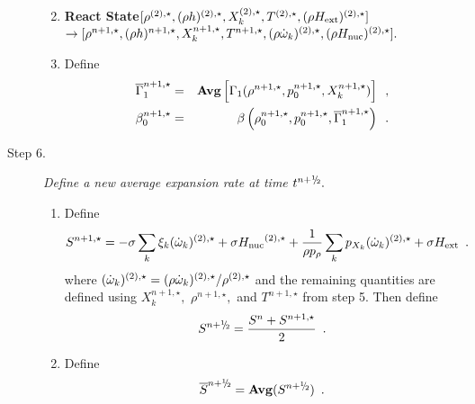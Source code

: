 \begin{description}
\begin{enumerate}
\renewcommand{\theenumi}{{\bf \alph{enumi}}}

\item {\bf React State}$[ \rho^{(2),\star},(\rho h)^{(2),\star}, X_k^{(2),\star}, 
                             T^{(2),\star}, (\rho{H_{\rm ext}})^{(2),\star}] $\\
$\rightarrow [ \rho^{n+1,\star},(\rho h)^{n+1,\star}, X_k^{n+1,\star}, T^{n+1,\star}, 
              (\rho \dot{\omega}_k)^{(2),\star}, (\rho {H_{\rm nuc}})^{(2),\star} ].$  

\item Define
\begin{eqnarray}
 \overline{\Gamma}_1^{n+1,\star}    &=& {\rm{\bf Avg}} \left[ \Gamma_1(\rho^{n+1,\star}, p_0^{n+1,\star}, 
                                                      X_k^{n+1,\star}) \right] \enskip , \\
 {\beta   }_0^{n+1,\star}    &=& \beta   \left(\rho_0^{n+1,\star}, p_0^{n+1,\star}, \overline{\Gamma}_1^{n+1,\star}\right) \enskip .
\end{eqnarray}

\end{enumerate}

\item[Step 6.] {\em Define a new average expansion rate at time $t^\nph.$}

\begin{enumerate}
\renewcommand{\theenumi}{{\bf \alph{enumi}}}
\item Define
\begin{equation}
  S^{n+1,\star} =  -\sigma  \sum_k  \xi_k  (\dot{\omega}_k)^{(2),\star}  + 
  \sigma {H_{\rm nuc}}^{(2),\star} +
  \frac{1}{\rho p_\rho} \sum_k p_{X_k}  ({\dot{\omega}}_k)^{(2),\star}  
  + \sigma {H_{\rm ext}} \enskip .
\end{equation} 
where $(\dot{\omega}_k)^{(2),\star} = (\rho \dot{\omega}_k)^{(2),\star} / \rho^{(2),\star}$
and the remaining quantities are defined using $X_k^{n+1,\star},$ $\rho^{n+1,\star},$ 
and $T^{n+1,\star}$ from step 5.
Then define
\begin{equation}
 S^\nph = \frac{S^n + S^{n+1,\star}}{2} \enskip. 
\end{equation}

\item Define
\begin{equation}
\overline{S}^{\nph} = {\mathrm{\bf Avg}} (S^{\nph}) \enskip.
\end{equation}


\end{enumerate}
\end{description}
